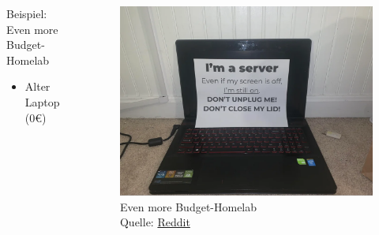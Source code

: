 \documentclass[
    ngerman,
    accentcolor=3b,
    fontsize= 12pt,
    a4paper,
    aspectratio=169,
    colorback=true,
    fancy_row_colors,
    leqno,
    fleqn,
    boxarc=3pt,
    fleqn,
    main,
    design=2008,
]{algoslides}
\begin{document}
    \begin{frame}
        \slidehead{}
        \begin{columns}[T]
            \begin{column}{.5\textwidth}
                Beispiel: Even more Budget-Homelab
                \begin{itemize}
                    \item Alter Laptop (0€)
                \end{itemize}
            \end{column}%
            \begin{column}{.5\textwidth}
                \begin{figure}[ht!]
                    \centering
                    \includegraphics[height=.5\textheight]{even-more-budget-setup.png}
                    \caption{Even more Budget-Homelab\\Quelle: \href{https://www.reddit.com/r/ProgrammerHumor/comments/11u7tp7/linux_ideapad_server/}{Reddit}}
                    \label{fig:even-more-budget-homelab}
                \end{figure}
            \end{column}%
        \end{columns}
    \end{frame}
\end{document}
